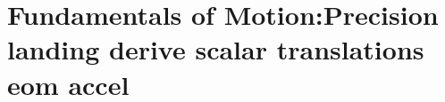 \section{ Fundamentals of Motion:Precision landing derive scalar translations eom accel }\label{sec:q2}    
